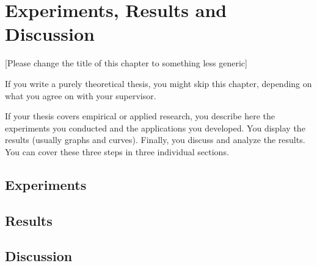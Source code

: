\chapter{Experiments, Results and Discussion}\label{results}
[Please change the title of this chapter to something less generic]

If you write a purely theoretical thesis, you might skip this chapter, depending on what you agree on with your supervisor. 

If your thesis covers empirical or applied research, you describe here the experiments you conducted  and the applications you developed. You display the results (usually graphs and curves). Finally, you discuss and analyze the results. You can cover these three steps in three individual sections.



\section{Experiments}

\section{Results}

\section{Discussion}